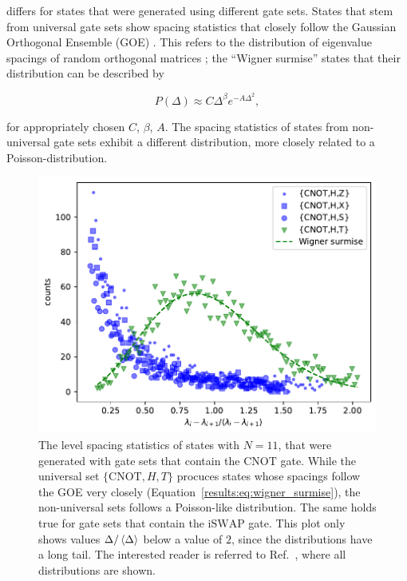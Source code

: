 \documentclass[reprint,amsmath,amssymb,aps,prb,nofootinbib]{revtex4-2}
\begin{document}
    differs for states that were generated using different gate sets. States that stem from universal gate sets show
    spacing statistics that closely follow the Gaussian Orthogonal Ensemble (GOE) \cite{Chamon:2014:EmergentIrreversibility}.
    This refers to the distribution of eigenvalue spacings of random orthogonal matrices \cite{Mehta:2003:RandomMatrices};
    the ``Wigner surmise'' states that their distribution can be described by \cite{Guler:2007:RandomMatrixTheoryIntrodution}

    \begin{equation}
        P(\Delta) \approx C\Delta^{\beta}e^{-A\Delta^2},
        \label{results:eq:wigner_surmise}
    \end{equation}

    for appropriately chosen $C$, $\beta$, $A$. The spacing statistics of states from non-universal gate sets exhibit
    a different distribution, more closely related to a Poisson-distribution.

    \begin{figure}[htb]
        \includegraphics[width=\columnwidth]{plots/level_spacing_head_CNOT.pdf}
        \caption{The level spacing statistics of states with $N=11$, that were generated with gate sets that contain
        the $\text{CNOT}$ gate. While the universal set $\{\text{CNOT},H,T\}$ procuces states whose spacings follow the
        GOE very closely (Equation~\ref{results:eq:wigner_surmise}), the non-universal sets follows a Poisson-like
        distribution. The same holds true for gate sets that contain the $\text{iSWAP}$ gate. This plot only shows
        values $\Delta/\braket{\Delta}$ below a value of $2$, since the distributions have a long tail. The interested
        reader is referred to Ref.~\cite{Kuehne:2024:EntanglementCooling}, where all distributions are shown.}
        \label{results:fig:level_spacing_head_CNOT}
    \end{figure}
\end{document}
